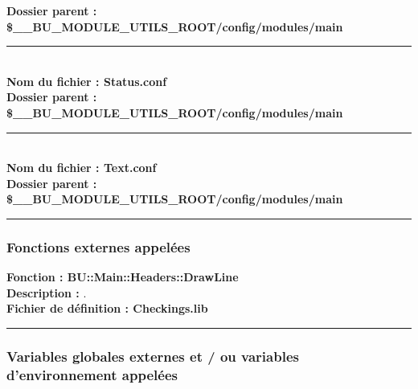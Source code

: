 \documentclass[a4paper,10pt]{article}
\begin{document}
\textbf{Dossier parent : \color{orange}\$\_\_BU\_MODULE\_UTILS\_ROOT\color{lime}/config/modules/main}\\[1\baselineskip]



\color{lime}\par\noindent\rule{\textwidth}{0.4pt}\color{white}\\[1\baselineskip]

\textbf{Nom du fichier : \color{lime}Status.conf}\\[1\baselineskip]

\textbf{Dossier parent : \color{orange}\$\_\_BU\_MODULE\_UTILS\_ROOT\color{lime}/config/modules/main}\\[1\baselineskip]



\color{lime}\par\noindent\rule{\textwidth}{0.4pt}\color{white}\\[1\baselineskip]

\textbf{Nom du fichier : \color{lime}Text.conf}\\[1\baselineskip]

\textbf{Dossier parent : \color{orange}\$\_\_BU\_MODULE\_UTILS\_ROOT\color{lime}/config/modules/main}\\[1\baselineskip]



\color{blue}\par\noindent\rule{\textwidth}{0.4pt}\color{white}

\color{blue}
\subsubsection{Fonctions externes appelées}\color{white}

\textbf{Fonction : \color{mauve}BU::Main::Headers::DrawLine}\\[1\baselineskip]

\textbf{Description :} .\\[1\baselineskip]

\textbf{Fichier de définition : \color{lime}Checkings.lib}\\[1\baselineskip]



\color{blue}\par\noindent\rule{\textwidth}{0.4pt}\color{white}

\color{blue}
\subsubsection{Variables globales externes et / ou variables d'environnement appelées}\color{white}
\end{document}

